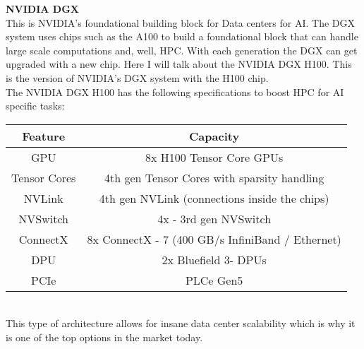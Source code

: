 \documentclass[12pt]{article}
\begin{document}
\textbf{NVIDIA DGX}\\
This is NVIDIA's foundational building block for Data centers for AI. The DGX system uses chips such as the A100 to build a foundational block that can handle large scale computations and, well, HPC. With each generation the DGX can get upgraded with a new chip. Here I will talk about the NVIDIA DGX H100. This is the version of NVIDIA's DGX system with the H100 chip.\\
The NVIDIA DGX H100 has the following specifications to boost HPC for AI specific tasks:\\
\begin{tabular}{c|c}
    \hline
    Feature & Capacity\\
    \hline
    GPU & 8x H100 Tensor Core GPUs\\
    Tensor Cores & 4th gen Tensor Cores with sparsity handling\\
    NVLink & 4th gen NVLink (connections inside the chips)\\
    NVSwitch & 4x - 3rd gen NVSwitch\\
    ConnectX & 8x ConnectX - 7 (400 GB/s InfiniBand / Ethernet)\\
    DPU & 2x Bluefield 3- DPUs\\
    PCIe & PLCe Gen5\\
    \hline
\end{tabular}\\
This type of architecture allows for insane data center scalability which is why it is one of the top options in the market today.
\end{document}
